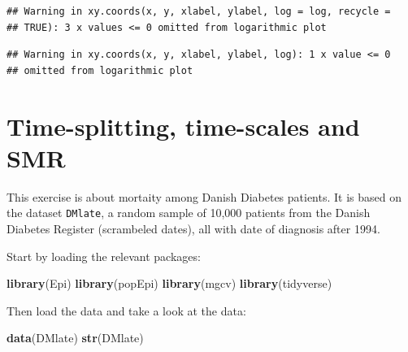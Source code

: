 \documentclass[
]{book}
\newenvironment{Shaded}{\begin{snugshade}}{\end{snugshade}}
\newcommand{\FunctionTok}[1]{\textcolor[rgb]{0.13,0.29,0.53}{\textbf{#1}}}
\newcommand{\NormalTok}[1]{#1}
\begin{document}
\begin{verbatim}
## Warning in xy.coords(x, y, xlabel, ylabel, log = log, recycle =
## TRUE): 3 x values <= 0 omitted from logarithmic plot
\end{verbatim}

\begin{verbatim}
## Warning in xy.coords(x, y, xlabel, ylabel, log): 1 x value <= 0
## omitted from logarithmic plot
\end{verbatim}

\chapter{Time-splitting, time-scales and SMR}\label{time-splitting-time-scales-and-smr}

This exercise is about mortaity among Danish Diabetes patients. It is
based on the dataset \texttt{DMlate}, a random sample of 10,000
patients from the Danish Diabetes Register (scrambeled dates), all
with date of diagnosis after 1994.

Start by loading the relevant packages:

\begin{Shaded}
\begin{Highlighting}[]
\FunctionTok{library}\NormalTok{(Epi)}
\FunctionTok{library}\NormalTok{(popEpi)}
\FunctionTok{library}\NormalTok{(mgcv)}
\FunctionTok{library}\NormalTok{(tidyverse)}
\end{Highlighting}
\end{Shaded}

Then load the data and take a look at the data:

\begin{Shaded}
\begin{Highlighting}[]
\FunctionTok{data}\NormalTok{(DMlate)}
\FunctionTok{str}\NormalTok{(DMlate)}
\end{Highlighting}
\end{Shaded}

\begin{Shaded}
\end{Shaded}
\end{document}
